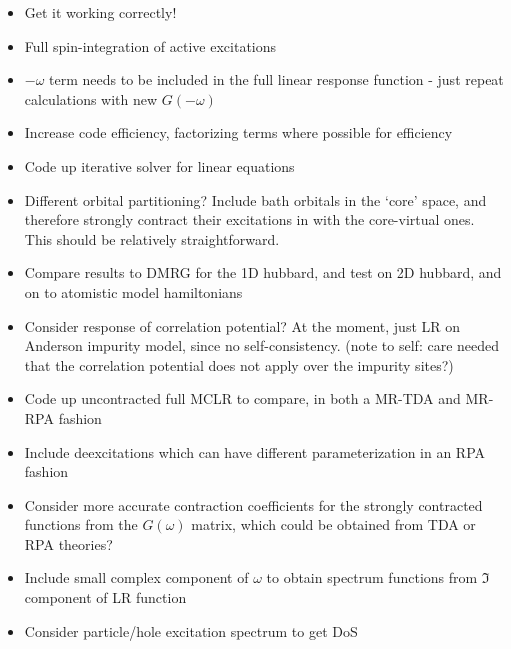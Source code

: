 \documentclass[a4paper,oneside,11pt]{article}
\numberwithin{equation}{section}
\begin{document}
\begin{itemize}
\item Get it working correctly!
\item Full spin-integration of active excitations
\item $-\omega$ term needs to be included in the full linear response function - just repeat calculations with new $G(-\omega)$
\item Increase code efficiency, factorizing terms where possible for efficiency
\item Code up iterative solver for linear equations
\item Different orbital partitioning? Include bath orbitals in the `core' space, and therefore strongly contract their excitations in with the core-virtual ones. This should be relatively straightforward.
\item Compare results to DMRG for the 1D hubbard, and test on 2D hubbard, and on to atomistic model hamiltonians
\item Consider response of correlation potential? At the moment, just LR on Anderson impurity model, since no self-consistency. (note to self: care needed that the correlation potential does not apply over the impurity sites?)
\item Code up uncontracted full MCLR to compare, in both a MR-TDA and MR-RPA fashion
\item Include deexcitations which can have different parameterization in an RPA fashion
\item Consider more accurate contraction coefficients for the strongly contracted functions from the $G(\omega)$ matrix, which could be obtained from TDA or RPA theories?
\item Include small complex component of $\omega$ to obtain spectrum functions from $\Im$ component of LR function
\item Consider particle/hole excitation spectrum to get DoS
\end{itemize}
\end{document}
